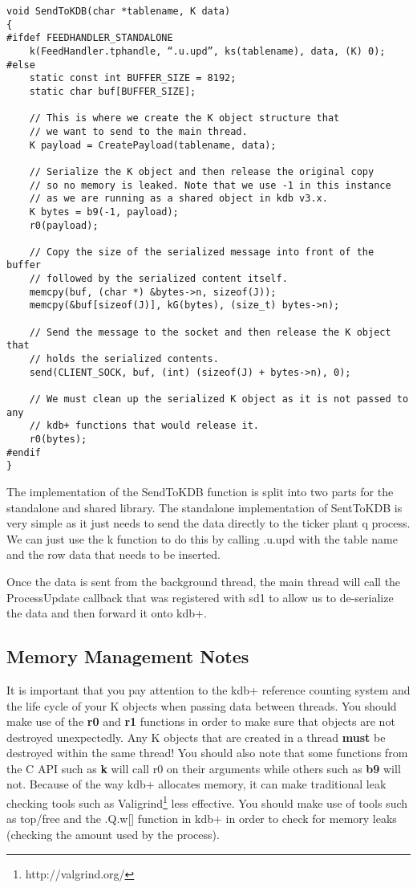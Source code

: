 \begin{lstlisting}
void SendToKDB(char *tablename, K data)
{
#ifdef FEEDHANDLER_STANDALONE
	k(FeedHandler.tphandle, “.u.upd”, ks(tablename), data, (K) 0);
#else
	static const int BUFFER_SIZE = 8192;
	static char buf[BUFFER_SIZE];

	// This is where we create the K object structure that
	// we want to send to the main thread.
	K payload = CreatePayload(tablename, data);

	// Serialize the K object and then release the original copy
	// so no memory is leaked. Note that we use -1 in this instance
	// as we are running as a shared object in kdb v3.x.
	K bytes = b9(-1, payload);
	r0(payload);

	// Copy the size of the serialized message into front of the buffer
	// followed by the serialized content itself.
	memcpy(buf, (char *) &bytes->n, sizeof(J));
	memcpy(&buf[sizeof(J)], kG(bytes), (size_t) bytes->n);

	// Send the message to the socket and then release the K object that
	// holds the serialized contents.
	send(CLIENT_SOCK, buf, (int) (sizeof(J) + bytes->n), 0);

	// We must clean up the serialized K object as it is not passed to any
	// kdb+ functions that would release it.
	r0(bytes);
#endif
}
\end{lstlisting}

The implementation of the SendToKDB function is split into two parts for the standalone and shared library. The standalone
implementation of SentToKDB is very simple as it just needs to send the data directly to the ticker plant q process. We can
just use the k function to do this by calling .u.upd with the table name and the row data that needs to be inserted.

Once the data is sent from the background thread, the main thread will call the ProcessUpdate callback that was registered
with sd1 to allow us to de-serialize the data and then forward it onto kdb+.

\subsection{Memory Management Notes}

It is important that you pay attention to the kdb+ reference counting system
and the life cycle of your K objects when passing data between threads. You should make use of the \textbf{r0} and \textbf{r1} functions in order to make sure that objects are not destroyed unexpectedly. Any K objects that are created in a thread \textbf{must} be destroyed within the same
thread! You should also note that some functions from the C API such as \textbf{k} will call r0 on their arguments while others such as \textbf{b9} will not. Because of the way kdb+ allocates memory, it can make traditional leak checking tools such as Valigrind\footnote{http://valgrind.org/} less effective. You should make use of tools such as top/free and the .Q.w[] function in kdb+ in order to check for memory leaks
(checking the amount used by the process).

